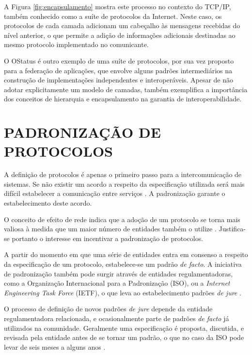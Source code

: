A Figura \ref{fig:encapsulamento} mostra este processo no contexto do TCP/IP, também
conhecido como a suíte de protocolos da Internet. Neste caso, os protocolos de cada
camada adicionam um cabeçalho às mensagens recebidas do nível anterior, o que
permite a adição de informações adicionais destinadas ao mesmo protocolo
implementado no comunicante.

O OStatus é outro exemplo de uma suíte de protocolos, por sua vez proposto para a
federação de aplicações, que envolve alguns padrões intermediários na construção de
implementações independentes e interoperáveis. Apesar de não adotar explicitamente
um modelo de camadas, também exemplifica a importância dos conceitos de hierarquia e
encapsulamento na garantia de interoperabilidade.



\section{PADRONIZAÇÃO DE PROTOCOLOS}

A definição de protocolos é apenas o primeiro passo para a intercomunicação de
sistemas. Se não existir um acordo a respeito da especificação utilizada será mais
difícil estabelecer a comunicação entre serviços \cite{kurose2012}. A padronização
garante o estabelecimento deste acordo.

\begin{sloppypar}
O conceito de efeito de rede indica que a adoção de um protocolo se torna mais
valiosa à medida que um maior número de entidades também o utilize
\cite{liebowitz1998}. Justifica-se portanto o interesse em incentivar a padronização
de protocolos.
\end{sloppypar}

A partir do momento em que uma série de entidades entra em consenso a respeito da
especificação de um protocolo, estabelece-se um padrão \textit{de facto}. A
iniciativa de padronização também pode surgir através de entidades regulamentadoras,
como a Organização Internacional para a Padronização (ISO), ou a \textit{Internet
Engineering Task Force} (IETF), o que leva ao estabelecimento padrões \textit{de
jure} \cite{tanenbaum2010}.

O processo de definição de novos padrões \textit{de jure} depende da entidade
regulamentadora relacionada, e ocasionalmente parte de padrões \textit{de facto} já
utilizados na comunidade. Geralmente uma especificação é proposta, discutida, e
revisada pela entidade antes de se tornar um padrão, o que no caso da ISO pode levar
de seis meses a alguns anos \cite{tanenbaum2010}.

